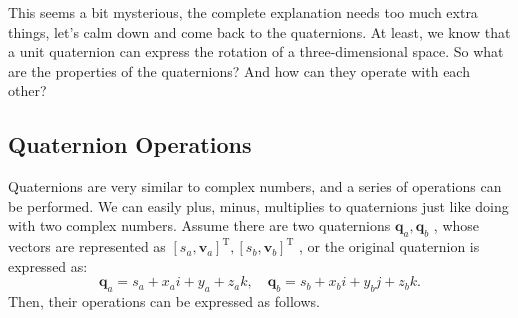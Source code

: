 This seems a bit mysterious, the complete explanation needs too much extra things, let's calm down and come back to the quaternions. At least, we know that a unit quaternion can express the rotation of a three-dimensional space. So what are the properties of the quaternions? And how can they operate with each other?

\subsection{Quaternion Operations}

Quaternions are very similar to complex numbers, and a series of operations can be performed. We can easily plus, minus, multiplies to quaternions just like doing with two complex numbers. Assume there are two quaternions $ \mathbf{q}_a, \mathbf{q}_b $ , whose vectors are represented as $ [s_a, \mathbf {v}_a]^ \mathrm {T}, [s_b, \mathbf{v}_b]^ \mathrm {T} $ , or the original quaternion is expressed as:
\[
\mathbf{q} _a = s_a + x_ai + y_a + z_ak, \quad  \mathbf {q} _b = s_b + x_bi + y_bj + z_bk.
\]
Then, their operations can be expressed as follows.

